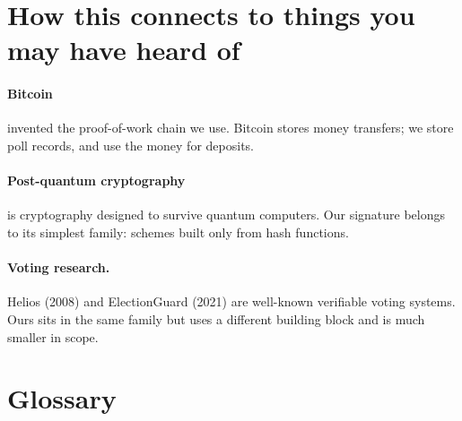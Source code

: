 \documentclass[11pt,a4paper]{article}
\begin{document}
\section{How this connects to things you may have heard of}

\paragraph{Bitcoin} invented the proof-of-work chain we use. Bitcoin stores
money transfers; we store poll records, and use the money for deposits.

\paragraph{Post-quantum cryptography} is cryptography designed to survive
quantum computers. Our signature belongs to its simplest family: schemes
built only from hash functions.

\paragraph{Voting research.} Helios (2008) and ElectionGuard (2021) are
well-known verifiable voting systems. Ours sits in the same family but uses
a different building block and is much smaller in scope.

\section{Glossary}
\end{document}
